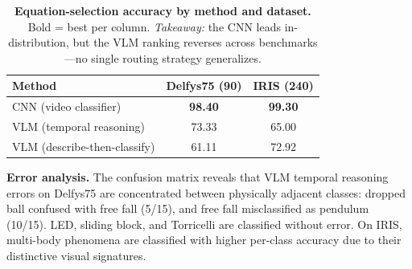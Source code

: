 \documentclass[runningheads]{llncs}
\begin{document}
\begin{table}[t]
  \centering
  \caption{\textbf{Equation-selection accuracy by method and dataset.} Bold = best per column. \emph{Takeaway:} the CNN leads in-distribution, but the VLM ranking reverses across benchmarks---no single routing strategy generalizes.}
  \label{tab:summary_vlm_methods}
  \small
  \setlength{\tabcolsep}{6pt}
  \renewcommand{\arraystretch}{1.2}
  \begin{tabular}{@{}lcc@{}}
    \toprule
    \textbf{Method} & \textbf{Delfys75 (90)} & \textbf{IRIS (240)} \\
    \midrule
    CNN (video classifier)   & \cellcolor{bestcolor}\textbf{98.40} & \cellcolor{bestcolor}\textbf{99.30} \\
    VLM (temporal reasoning) & 73.33 & 65.00 \\
    VLM (describe-then-classify) & 61.11 & 72.92 \\
    \bottomrule
  \end{tabular}
\end{table}
\noindent
\textbf{Error analysis.} The confusion matrix  reveals that VLM temporal reasoning errors on Delfys75 are concentrated between physically adjacent classes: dropped ball confused with free fall (5/15), and free fall misclassified as pendulum (10/15). LED, sliding block, and Torricelli are classified without error. On IRIS, multi-body phenomena are classified with higher per-class accuracy due to their distinctive visual signatures.




\end{document}
